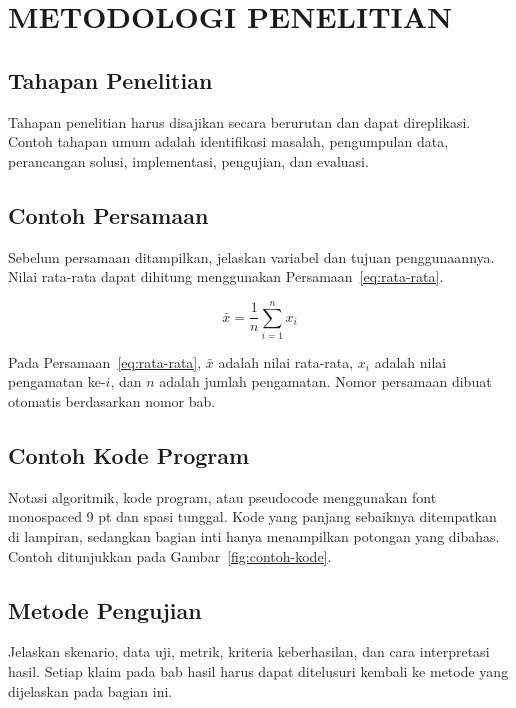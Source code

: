 \chapter{METODOLOGI PENELITIAN}


\section{Tahapan Penelitian}

Tahapan penelitian harus disajikan secara berurutan dan dapat direplikasi. Contoh tahapan umum adalah identifikasi masalah, pengumpulan data, perancangan solusi, implementasi, pengujian, dan evaluasi.

\section{Contoh Persamaan}

Sebelum persamaan ditampilkan, jelaskan variabel dan tujuan penggunaannya. Nilai rata-rata dapat dihitung menggunakan Persamaan~\eqref{eq:rata-rata}.

\begin{equation}
  \bar{x} = \frac{1}{n}\sum_{i=1}^{n}x_i
  \label{eq:rata-rata}
\end{equation}

Pada Persamaan~\eqref{eq:rata-rata}, $\bar{x}$ adalah nilai rata-rata, $x_i$ adalah nilai pengamatan ke-$i$, dan $n$ adalah jumlah pengamatan. Nomor persamaan dibuat otomatis berdasarkan nomor bab.

\section{Contoh Kode Program}

Notasi algoritmik, kode program, atau pseudocode menggunakan font monospaced 9 pt dan spasi tunggal. Kode yang panjang sebaiknya ditempatkan di lampiran, sedangkan bagian inti hanya menampilkan potongan yang dibahas. Contoh ditunjukkan pada Gambar~\ref{fig:contoh-kode}.



\section{Metode Pengujian}

Jelaskan skenario, data uji, metrik, kriteria keberhasilan, dan cara interpretasi hasil. Setiap klaim pada bab hasil harus dapat ditelusuri kembali ke metode yang dijelaskan pada bagian ini.

